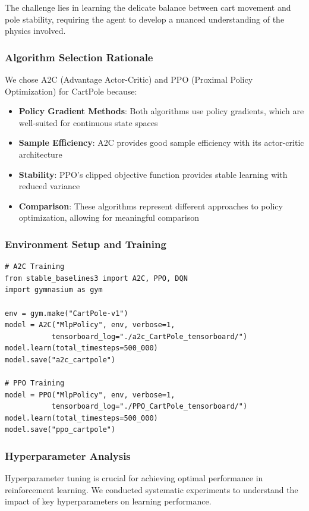 \documentclass[12pt]{article}
\begin{document}
{{{The challenge lies in learning the delicate balance between cart movement and pole stability, requiring the agent to develop a nuanced understanding of the physics involved.

\subsubsection{Algorithm Selection Rationale}

We chose A2C (Advantage Actor-Critic) and PPO (Proximal Policy Optimization) for CartPole because:

\begin{itemize}
    \item \textbf{Policy Gradient Methods}: Both algorithms use policy gradients, which are well-suited for continuous state spaces
    \item \textbf{Sample Efficiency}: A2C provides good sample efficiency with its actor-critic architecture
    \item \textbf{Stability}: PPO's clipped objective function provides stable learning with reduced variance
    \item \textbf{Comparison}: These algorithms represent different approaches to policy optimization, allowing for meaningful comparison
\end{itemize}

\subsubsection{Environment Setup and Training}

\begin{verbatim}
# A2C Training
from stable_baselines3 import A2C, PPO, DQN
import gymnasium as gym

env = gym.make("CartPole-v1")
model = A2C("MlpPolicy", env, verbose=1, 
           tensorboard_log="./a2c_CartPole_tensorboard/")
model.learn(total_timesteps=500_000)
model.save("a2c_cartpole")

# PPO Training
model = PPO("MlpPolicy", env, verbose=1, 
           tensorboard_log="./PPO_CartPole_tensorboard/")
model.learn(total_timesteps=500_000)
model.save("ppo_cartpole")
\end{verbatim}

\subsubsection{Hyperparameter Analysis}

Hyperparameter tuning is crucial for achieving optimal performance in reinforcement learning. We conducted systematic experiments to understand the impact of key hyperparameters on learning performance.

}}}
\end{document}
